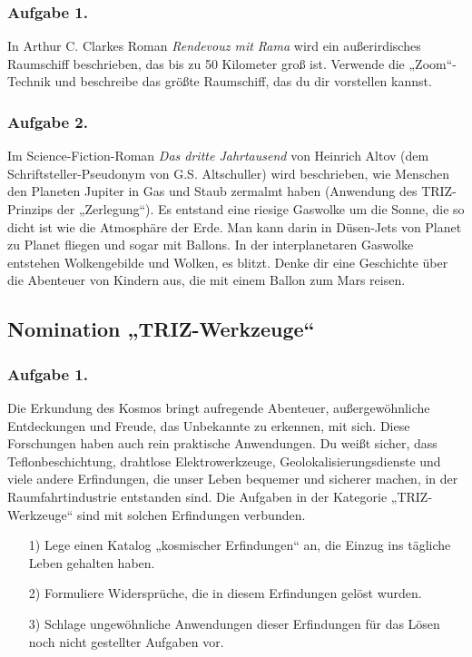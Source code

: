 \documentclass[11pt,a4paper]{article}
\begin{document}
\subsubsection*{Aufgabe 1.}
In Arthur C. Clarkes Roman \emph{Rendevouz mit Rama} wird ein außerirdisches
Raumschiff beschrieben, das bis zu 50 Kilometer groß ist. Verwende die
„Zoom“-Technik und beschreibe das größte Raumschiff, das du dir vorstellen
kannst.

\subsubsection*{Aufgabe 2.}

Im Science-Fiction-Roman \emph{Das dritte Jahrtausend} von Heinrich Altov (dem
Schriftsteller-Pseudonym von G.S. Altschuller) wird beschrieben, wie Menschen
den Planeten Jupiter in Gas und Staub zermalmt haben (Anwendung des
TRIZ-Prinzips der „Zerlegung“). Es entstand eine riesige Gaswolke um die
Sonne, die so dicht ist wie die Atmosphäre der Erde. Man kann darin in
Düsen-Jets von Planet zu Planet fliegen und sogar mit Ballons. In der
interplanetaren Gaswolke entstehen Wolkengebilde und Wolken, es blitzt. Denke
dir eine Geschichte über die Abenteuer von Kindern aus, die mit einem Ballon
zum Mars reisen.

\subsection{Nomination „TRIZ-Werkzeuge“}

\subsubsection*{Aufgabe 1.}
Die Erkundung des Kosmos bringt aufregende Abenteuer, außergewöhnliche
Entdeckungen und Freude, das Unbekannte zu erkennen, mit sich. Diese
Forschungen haben auch rein praktische Anwendungen. Du weißt sicher, dass
Teflonbeschichtung, drahtlose Elektrowerkzeuge, Geolokalisierungsdienste und
viele andere Erfindungen, die unser Leben bequemer und sicherer machen, in der
Raumfahrtindustrie entstanden sind. Die Aufgaben in der Kategorie
„TRIZ-Werkzeuge“ sind mit solchen Erfindungen verbunden.

\begin{itemize}[noitemsep]
\item[1)] Lege einen Katalog „kosmischer Erfindungen“ an, die Einzug ins
  tägliche Leben gehalten haben.
\item[2)] Formuliere Widersprüche, die in diesem Erfindungen gelöst wurden. 
\item[3)] Schlage ungewöhnliche Anwendungen dieser Erfindungen für das Lösen
  noch nicht gestellter Aufgaben vor.
\end{itemize}
\end{document}
